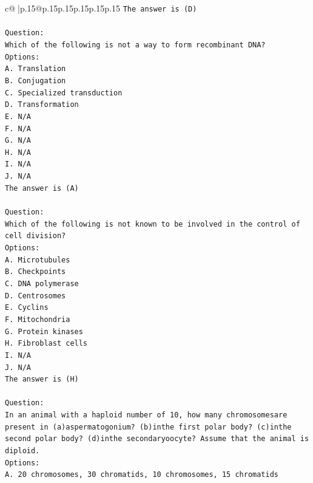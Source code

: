 \documentclass{article}
\begin{document}
{\begin{supertabular}{c@{$\;$}|p{.15\linewidth}@{}p{.15\linewidth}p{.15\linewidth}p{.15\linewidth}p{.15\linewidth}p{.15\linewidth}}
{{{\texttt{The answer is (D)} \\
\\ 
\texttt{Question:} \\
\texttt{Which of the following is not a way to form recombinant DNA?} \\
\texttt{Options:} \\
\texttt{A. Translation} \\
\texttt{B. Conjugation} \\
\texttt{C. Specialized transduction} \\
\texttt{D. Transformation} \\
\texttt{E. N/A} \\
\texttt{F. N/A} \\
\texttt{G. N/A} \\
\texttt{H. N/A} \\
\texttt{I. N/A} \\
\texttt{J. N/A} \\
\texttt{The answer is (A)} \\
\\ 
\texttt{Question:} \\
\texttt{Which of the following is not known to be involved in the control of cell division?} \\
\texttt{Options:} \\
\texttt{A. Microtubules} \\
\texttt{B. Checkpoints} \\
\texttt{C. DNA polymerase} \\
\texttt{D. Centrosomes} \\
\texttt{E. Cyclins} \\
\texttt{F. Mitochondria} \\
\texttt{G. Protein kinases} \\
\texttt{H. Fibroblast cells} \\
\texttt{I. N/A} \\
\texttt{J. N/A} \\
\texttt{The answer is (H)} \\
\\ 
\texttt{Question:} \\
\texttt{In an animal with a haploid number of 10, how many chromosomesare present in (a)aspermatogonium? (b)inthe first polar body? (c)inthe second polar body? (d)inthe secondaryoocyte? Assume that the animal is diploid.} \\
\texttt{Options:} \\
\texttt{A. 20 chromosomes, 30 chromatids, 10 chromosomes, 15 chromatids} \\
}}}
\end{supertabular}}
\end{document}
